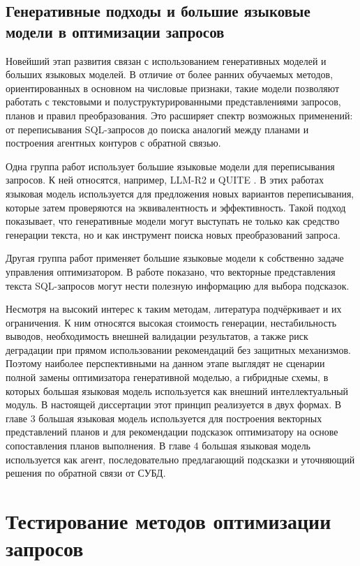 \subsection{Генеративные подходы и большие языковые модели в оптимизации запросов}

Новейший этап развития связан с использованием генеративных моделей и больших языковых моделей. В отличие от более ранних обучаемых методов, ориентированных в основном на числовые признаки, такие модели позволяют работать с текстовыми и полуструктурированными представлениями запросов, планов и правил преобразования. Это расширяет спектр возможных применений: от переписывания SQL-запросов до поиска аналогий между планами и построения агентных контуров с обратной связью.

Одна группа работ использует большие языковые модели для переписывания запросов. К ней относятся, например, LLM-R2 \cite{li2024llmr2} и QUITE \cite{song2026quitequeryrewriterules}. В этих работах языковая модель используется для предложения новых вариантов переписывания, которые затем проверяются на эквивалентность и эффективность. Такой подход показывает, что генеративные модели могут выступать не только как средство генерации текста, но и как инструмент поиска новых преобразований запроса.

Другая группа работ применяет большие языковые модели к собственно задаче управления оптимизатором. В работе \cite{akioyamen2024unreasonableeffectivenessllmsquery} показано, что векторные представления текста SQL-запросов могут нести полезную информацию для выбора подсказок. 

Несмотря на высокий интерес к таким методам, литература подчёркивает и их ограничения. К ним относятся высокая стоимость генерации, нестабильность выводов, необходимость внешней валидации результатов, а также риск деградации при прямом использовании рекомендаций без защитных механизмов. Поэтому наиболее перспективными на данном этапе выглядят не сценарии полной замены оптимизатора генеративной моделью, а гибридные схемы, в которых большая языковая модель используется как внешний интеллектуальный модуль. В настоящей диссертации этот принцип реализуется в двух формах. В главе 3 большая языковая модель используется для построения векторных представлений планов и для рекомендации подсказок оптимизатору на основе сопоставления планов выполнения. В главе 4 большая языковая модель используется как агент, последовательно предлагающий подсказки и уточняющий решения по обратной связи от СУБД.

\section{Тестирование методов оптимизации запросов}\label{sec:ch1/sec3}

